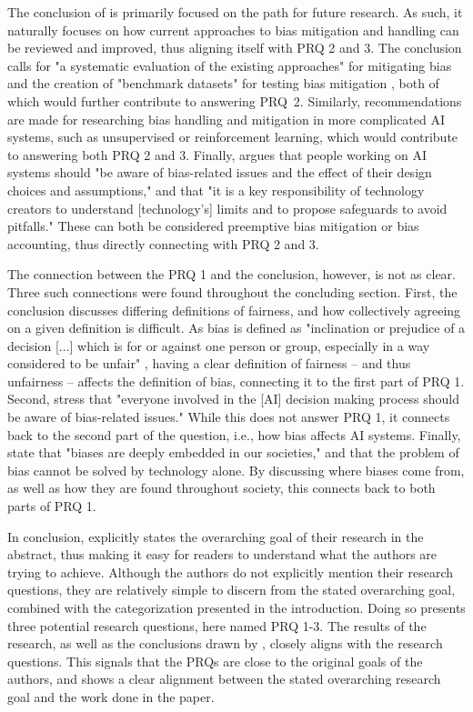 The conclusion of \textcite{Ntoutsi_2020} is primarily focused on the path for future research. As such, it naturally focuses on how current approaches to bias mitigation and handling can be reviewed and improved, thus aligning itself with PRQ 2 and 3. The conclusion calls for "a systematic evaluation of the existing approaches" for mitigating bias and the creation of "benchmark datasets" for testing bias mitigation \parencite[p.9-10]{Ntoutsi_2020}, both of which would further contribute to answering PRQ~2. Similarly, recommendations are made for researching bias handling and mitigation in more complicated AI systems, such as unsupervised or reinforcement learning, which would contribute to answering both PRQ 2 and 3. Finally, \textcite[p.10]{Ntoutsi_2020} argues that people working on AI systems should "be aware of bias-related issues and the effect of their design choices and assumptions," and that "it is a key responsibility of technology creators to understand [technology's] limits and to propose safeguards to avoid pitfalls." These can both be considered preemptive bias mitigation or bias accounting, thus directly connecting with PRQ 2 and 3.

The connection between the PRQ 1 and the conclusion, however, is not as clear. Three such connections were found throughout the concluding section. First, the conclusion discusses differing definitions of fairness, and how collectively agreeing on a given definition is difficult. As bias is defined as "inclination or prejudice of a decision [...] which is for or against one person or group, especially in a way considered to be unfair" \textcite[p.3]{Ntoutsi_2020}, having a clear definition of fairness -- and thus unfairness -- affects the definition of bias, connecting it to the first part of PRQ 1. Second, \textcite[p.10]{Ntoutsi_2020} stress that "everyone involved in the [AI] decision making process should be aware of bias-related issues." While this does not answer PRQ 1, it connects back to the second part of the question, i.e., how bias affects AI systems. Finally, \textcite[p.10]{Ntoutsi_2020} state that "biases are deeply embedded in our societies," and that the problem of bias cannot be solved by technology alone. By discussing where biases come from, as well as how they are found throughout society, this connects back to both parts of PRQ 1.


In conclusion, \textcite{Ntoutsi_2020} explicitly states the overarching goal of their research in the abstract, thus making it easy for readers to understand what the authors are trying to achieve. Although the authors do not explicitly mention their research questions, they are relatively simple to discern from the stated overarching goal, combined with the categorization presented in the introduction. Doing so presents three potential research questions, here named PRQ 1-3. The results of the research, as well as the conclusions drawn by \textcite{Ntoutsi_2020}, closely aligns with the research questions. This signals that the PRQs are close to the original goals of the authors, and shows a clear alignment between the stated overarching research goal and the work done in the paper.
